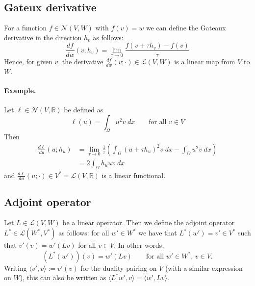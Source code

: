 \documentclass[11pt]{article}
\begin{document}
\subsection{Gateux derivative}
 For a function $f\in \mathcal{N}(V,W)$ with $f(v) = w$ we  can define the Gateaux derivative in the direction $h_v$ as follows:
\begin{equation}
    \frac{df}{dw}(v;h_v) = \lim_{\tau\rightarrow 0}\frac{f(v+\tau h_v)-f(v)}{\tau}
\end{equation}
Hence, for given $v$, the derivative $\frac{df}{dw}(v;\cdot)\in \mathcal{L}(V,W)$ is a linear map from $V$ to $W$.
\paragraph{Example.} Let $\ell\in \mathcal{N}(V,\mathbb{R})$ be defined as
\begin{equation}
    \ell(u) = \int_\Omega u^2 v\; dx \qquad\text{for all $v\in V$}
\end{equation}
Then
\begin{equation}
    \begin{aligned}
    \frac{d\ell}{d u}(u;h_u) &= \lim_{\tau\rightarrow 0} \frac{1}{\tau}\left(\int_\Omega (u+\tau h_u)^2 v\; dx - \int_\Omega u^2 v\; dx\right)\\
    &= 2\int_\Omega h_u u v\; dx
    \end{aligned}
\end{equation}
and $\frac{d\ell}{d u}(u;\cdot) \in V^* = \mathcal{L}(V,\mathbb{R})$ is a linear functional.
\subsection{Adjoint operator}
Let $L\in\mathcal{L}(V,W)$ be a linear operator. Then we define the adjoint operator $L^*\in\mathcal{L}(W^*,V^*)$ as follows: for all $w'\in W^*$ we have that
$L^*(w') = v' \in V^*$ such that $v'(v) = w'(Lv)$ for all $v\in V$. In other words,
\begin{equation}
    \left(L^*(w')\right)(v) = w'(Lv)\qquad\text{for all $w'\in W^*$, $v\in V$.}
\end{equation}
Writing $\langle v',v\rangle := v'(v)$ for the duality pairing on $V$ (with a similar expression on $W$), this can also be written as $\langle L^*w',v\rangle = \langle w', Lv\rangle$.
\end{document}
